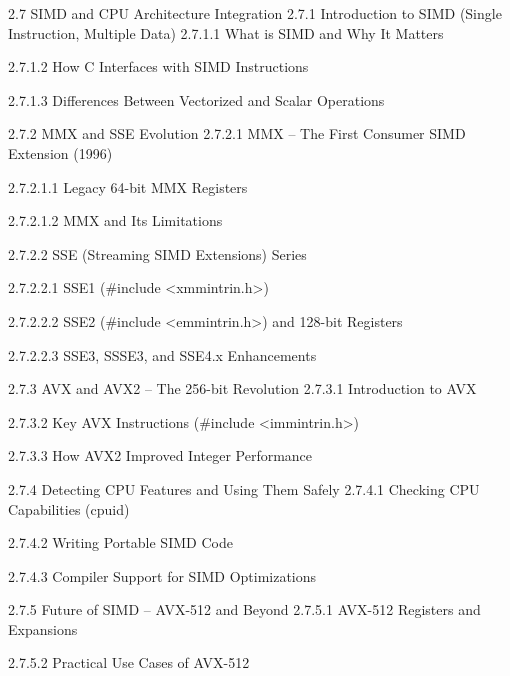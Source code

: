 2.7 SIMD and CPU Architecture Integration
2.7.1 Introduction to SIMD (Single Instruction, Multiple Data)
2.7.1.1 What is SIMD and Why It Matters

2.7.1.2 How C Interfaces with SIMD Instructions

2.7.1.3 Differences Between Vectorized and Scalar Operations

2.7.2 MMX and SSE Evolution
2.7.2.1 MMX – The First Consumer SIMD Extension (1996)

2.7.2.1.1 Legacy 64-bit MMX Registers

2.7.2.1.2 MMX and Its Limitations

2.7.2.2 SSE (Streaming SIMD Extensions) Series

2.7.2.2.1 SSE1 (#include <xmmintrin.h>)

2.7.2.2.2 SSE2 (#include <emmintrin.h>) and 128-bit Registers

2.7.2.2.3 SSE3, SSSE3, and SSE4.x Enhancements

2.7.3 AVX and AVX2 – The 256-bit Revolution
2.7.3.1 Introduction to AVX

2.7.3.2 Key AVX Instructions (#include <immintrin.h>)

2.7.3.3 How AVX2 Improved Integer Performance

2.7.4 Detecting CPU Features and Using Them Safely
2.7.4.1 Checking CPU Capabilities (cpuid)

2.7.4.2 Writing Portable SIMD Code

2.7.4.3 Compiler Support for SIMD Optimizations

2.7.5 Future of SIMD – AVX-512 and Beyond
2.7.5.1 AVX-512 Registers and Expansions

2.7.5.2 Practical Use Cases of AVX-512

